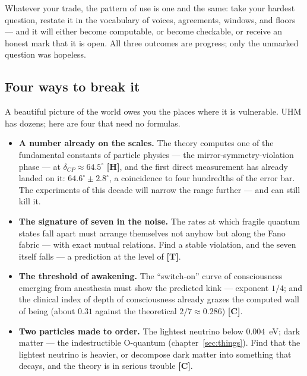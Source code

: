\documentclass[11pt,letterpaper]{article}
\newcommand{\stT}{\textbf{[T]}\xspace}
\newcommand{\stC}{\textbf{[C]}\xspace}
\newcommand{\stH}{\textbf{[H]}\xspace}
\begin{document}
Whatever your trade, the pattern of use is one and the same: take
your hardest question, restate it in the vocabulary of voices,
agreements, windows, and floors --- and it will either become
computable, or become checkable, or receive an honest mark that it
is open. All three outcomes are progress; only the unmarked question
was hopeless.

\subsection*{Four ways to break it}

A beautiful picture of the world owes you the places where it is
vulnerable. UHM has dozens; here are four that need no formulas.

\begin{itemize}[leftmargin=1.6em]
  \item \textbf{A number already on the scales.} The theory computes
        one of the fundamental constants of particle physics --- the
        mirror-symmetry-violation phase --- at
        $\delta_{CP}\approx 64.5^\circ$ \stH, and the first direct
        measurement has already landed on it:
        $64.6^\circ\pm2.8^\circ$, a coincidence to four hundredths
        of the error bar. The experiments of this decade will narrow
        the range further --- and can still kill it.
  \item \textbf{The signature of seven in the noise.} The rates at
        which fragile quantum states fall apart must arrange
        themselves not anyhow but along the Fano fabric --- with
        exact mutual relations. Find a stable violation, and the
        seven itself falls --- a prediction at the level of \stT.
  \item \textbf{The threshold of awakening.} The ``switch-on'' curve
        of consciousness emerging from anesthesia must show the
        predicted kink --- exponent $1/4$; and the clinical index of
        depth of consciousness already grazes the computed wall of
        being (about $0.31$ against the theoretical
        $2/7\approx0.286$) \stC.
  \item \textbf{Two particles made to order.} The lightest neutrino
        below $0.004$~eV; dark matter --- the indestructible
        O-quantum (chapter~\ref{sec:things}). Find that the lightest
        neutrino is heavier, or decompose dark matter into something
        that decays, and the theory is in serious trouble \stC.
\end{itemize}
\end{document}
